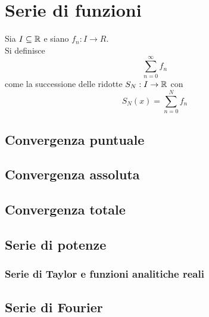 \section{Serie di funzioni}

\begin{definition}
    Sia $I \subseteq \mathbb{R}$ e siano $f_n: I \to R$.\\
    Si definisce 
    \begin{equation}
        \sum_{n=0}^\infty f_n
    \end{equation}
    come la successione delle ridotte $S_N : I \to \mathbb{R}$ con
    \begin{equation}
        S_N(x) = \sum_{n=0}^N f_n
    \end{equation}
\end{definition}

\subsection{Convergenza puntuale}

\subsection{Convergenza assoluta}

\subsection{Convergenza totale}

\subsection{Serie di potenze}

\subsubsection{Serie di Taylor e funzioni analitiche reali}

\subsection{Serie di Fourier}